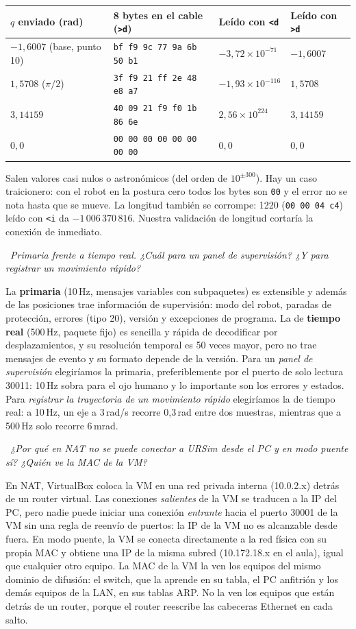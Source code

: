 \documentclass[10pt,a4paper]{article}
\newcommand{\code}[1]{\texttt{\small #1}}
\newcommand{\preg}[2]{\par\smallskip\noindent{\color{azul}\bfseries P#1.}~{\itshape #2}\par\nopagebreak}
\begin{document}
\begin{center}\small
\begin{tabular}{@{}l l l l@{}}
\toprule
$q$ enviado (rad) & 8 bytes en el cable (\code{>d}) & Leído con \code{<d} & Leído con \code{>d}\\ \midrule
$-1{,}6007$ (base, punto 10) & \code{bf f9 9c 77 9a 6b 50 b1} & $-3{,}72\times10^{-71}$ & $-1{,}6007$ \\
$1{,}5708$ ($\pi/2$) & \code{3f f9 21 ff 2e 48 e8 a7} & $-1{,}93\times10^{-116}$ & $1{,}5708$ \\
$3{,}14159$ & \code{40 09 21 f9 f0 1b 86 6e} & $2{,}56\times10^{224}$ & $3{,}14159$ \\
$0{,}0$ & \code{00 00 00 00 00 00 00 00} & $0{,}0$ & $0{,}0$ \\ \bottomrule
\end{tabular}
\end{center}

Salen valores casi nulos o astronómicos (del orden de $10^{\pm300}$). Hay un caso traicionero: con el robot en la postura cero todos los bytes son \code{00} y el error no se nota hasta que se mueve. La longitud también se corrompe: 1220 (\code{00 00 04 c4}) leído con \code{<i} da $-1\,006\,370\,816$. Nuestra validación de longitud cortaría la conexión de inmediato.

\preg{4}{Primaria frente a tiempo real. ¿Cuál para un panel de supervisión? ¿Y para registrar un movimiento rápido?}
La \textbf{primaria} (10\,Hz, mensajes variables con subpaquetes) es extensible y además de las posiciones trae información de supervisión: modo del robot, paradas de protección, errores (tipo 20), versión y excepciones de programa. La de \textbf{tiempo real} (500\,Hz, paquete fijo) es sencilla y rápida de decodificar por desplazamientos, y su resolución temporal es 50 veces mayor, pero no trae mensajes de evento y su formato depende de la versión. Para un \emph{panel de supervisión} elegiríamos la primaria, preferiblemente por el puerto de solo lectura 30011: 10\,Hz sobra para el ojo humano y lo importante son los errores y estados. Para \emph{registrar la trayectoria de un movimiento rápido} elegiríamos la de tiempo real: a 10\,Hz, un eje a 3\,rad/s recorre 0,3\,rad entre dos muestras, mientras que a 500\,Hz solo recorre 6\,mrad.

\preg{5}{¿Por qué en NAT no se puede conectar a URSim desde el PC y en modo puente sí? ¿Quién ve la MAC de la VM?}
En NAT, VirtualBox coloca la VM en una red privada interna (10.0.2.x) detrás de un router virtual. Las conexiones \emph{salientes} de la VM se traducen a la IP del PC, pero nadie puede iniciar una conexión \emph{entrante} hacia el puerto 30001 de la VM sin una regla de reenvío de puertos: la IP de la VM no es alcanzable desde fuera. En modo puente, la VM se conecta directamente a la red física con su propia MAC y obtiene una IP de la misma subred (10.172.18.x en el aula), igual que cualquier otro equipo. La MAC de la VM la ven los equipos del mismo dominio de difusión: el switch, que la aprende en su tabla, el PC anfitrión y los demás equipos de la LAN, en sus tablas ARP. No la ven los equipos que están detrás de un router, porque el router reescribe las cabeceras Ethernet en cada salto.
\end{document}
